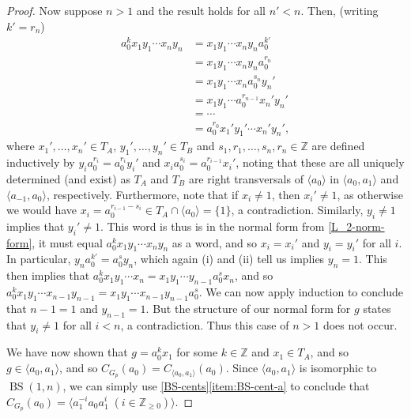 \documentclass[11pt]{amsart}
\theoremstyle{definition}
\numberwithin{theorem}{section}
\newcommand{\Z}{\mathbb{Z}}
\begin{document}
\begin{proof}
	Now suppose \(n > 1\) and the result holds for all \(n' < n\). Then,
	(writing \(k' = r_n\))
	\begin{align*}
		a_0^{k} x_1 y_1 \cdots x_n y_n 
		& = x_1 y_1 \cdots x_n y_na_0^{k'} \\
		& = x_1 y_1 \cdots x_n y_na_0^{r_n} \\
		& = x_1 y_1 \cdots x_n a_0^{s_{n}} y_n' \\
		& = x_1 y_1 \cdots a_0^{r_{n - 1}} x_n' y_n' \\
		& = \cdots \\
		& = a_0^{r_{0}} x_1' y_1' \cdots x_n' y_n',
	\end{align*}
	where \(x_1', \ldots, x_n' \in T_A\), \(y_1', \ldots, y_n' \in T_B\) and
	\(s_1,r_1, \ldots, s_{n}, r_n \in \Z\) are defined inductively by \(y_i
	a_0^{r_i} = a_0^{r_i} y_i'  \) and \(x_i a_0^{s_i} = a_0^{r_{i - 1}}
	x_i'\), noting that these are all uniquely determined (and exist) as
	\(T_A\) and \(T_B\) are right transversals of \(\langle a_0 \rangle\) in
	\(\langle a_0, a_1 \rangle\) and \(\langle a_{-1}, a_0 \rangle\),
	respectively. Furthermore, note that if \(x_i \neq 1\), then \(x_i' \neq
	1\), as otherwise we would have \(x_i = a_0^{r_{i - 1} - s_i} \in T_A \cap
	\langle a_0 \rangle = \{1\}\), a contradiction. Similarly, \(y_i \neq 1\)
	implies that \(y_i' \neq 1\). This word is thus is in the normal form from
	\cref{L_2-norm-form}, it must equal \(a_0^{k} x_1 y_1 \cdots x_n y_n\) as a
	word, and so \(x_i = x_i'\) and \(y_i = y_i'\) for all \(i\). In
	particular, \(y_n a_0^{k'} = a_0^s y_n\), which again (i) and (ii) tell us
	implies \(y_n = 1\). This then implies that \(a_0^{k} x_1 y_1 \cdots x_n =
	x_1 y_1 \cdots y_{n - 1} a_0^s x_n\), and so \(a_0^{k} x_1 y_1 \cdots x_{n
	- 1} y_{n - 1} = x_1 y_1 \cdots x_{n - 1} y_{n - 1} a_0^s\). We can now
	apply induction to conclude that \(n - 1 = 1\) and \(y_{n - 1} = 1\). But
	the structure of our normal form for \(g\) states that \(y_i \neq 1\) for
	all \(i < n\), a contradiction. Thus this case of \(n > 1\) does not occur.
	
	 We have now shown that \(g = a_0^k x_1\) for some \(k \in \Z\) and \(x_1
	 \in T_A\), and so \(g \in \langle a_0, a_1 \rangle\), and so
	 \(C_{G_p}(a_0) = C_{\langle a_0, a_1 \rangle}(a_0)\). Since \(\langle a_0,
	 a_1 \rangle\) is isomorphic to \(\operatorname{BS}(1, n)\), we can simply
	 use \cref{BS-cents}\eqref{item:BS-cent-a} to conclude that \(C_{G_p}(a_0)
	 = \langle a_1^{-i} a_0 a_1^{i} \; (i \in \Z_{\geq 0}) \rangle\).
\end{proof}
\end{document}
